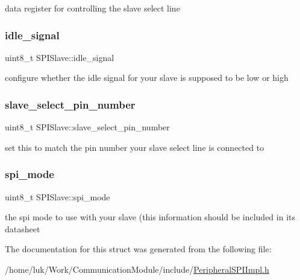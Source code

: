 data register for controlling the slave select line \mbox{\label{structSPISlave_a8dd52992c7350335723d6d7dfbca5bab}} 
\subsubsection{\texorpdfstring{idle\+\_\+signal}{idle\_signal}}
{\footnotesize\ttfamily uint8\+\_\+t S\+P\+I\+Slave\+::idle\+\_\+signal}

configure whether the idle signal for your slave is supposed to be low or high \mbox{\label{structSPISlave_a7cf55825192923f25fa0d288e9c29491}} 
\subsubsection{\texorpdfstring{slave\+\_\+select\+\_\+pin\+\_\+number}{slave\_select\_pin\_number}}
{\footnotesize\ttfamily uint8\+\_\+t S\+P\+I\+Slave\+::slave\+\_\+select\+\_\+pin\+\_\+number}

set this to match the pin number your slave select line is connected to \mbox{\label{structSPISlave_a0099538d21ea9158d57f8e825ffa8e22}} 
\subsubsection{\texorpdfstring{spi\+\_\+mode}{spi\_mode}}
{\footnotesize\ttfamily uint8\+\_\+t S\+P\+I\+Slave\+::spi\+\_\+mode}

the spi mode to use with your slave (this information should be included in its datasheet 

The documentation for this struct was generated from the following file\+:\begin{DoxyCompactItemize}
\item 
/home/luk/\+Work/\+Communication\+Module/include/\mbox{\hyperlink{PeripheralSPIImpl_8h}{Peripheral\+S\+P\+I\+Impl.\+h}}\end{DoxyCompactItemize}
